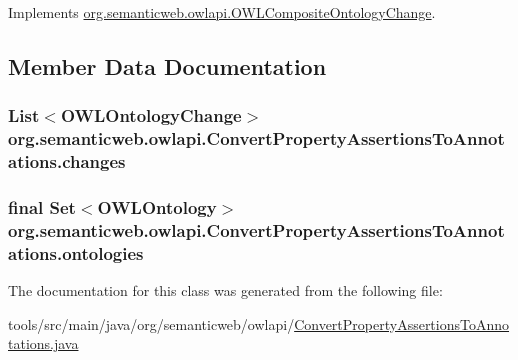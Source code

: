 Implements \hyperlink{interfaceorg_1_1semanticweb_1_1owlapi_1_1_o_w_l_composite_ontology_change_a047d3f540ac840c0ac0285bc576636d2}{org.\-semanticweb.\-owlapi.\-O\-W\-L\-Composite\-Ontology\-Change}.



\subsection{Member Data Documentation}
\hypertarget{classorg_1_1semanticweb_1_1owlapi_1_1_convert_property_assertions_to_annotations_a730c4ead4538d218122f2b6ddeae762f}{
\subsubsection[{changes}]{\setlength{\rightskip}{0pt plus 5cm}List$<${\bf O\-W\-L\-Ontology\-Change}$>$ org.\-semanticweb.\-owlapi.\-Convert\-Property\-Assertions\-To\-Annotations.\-changes\hspace{0.3cm}{\ttfamily [private]}}}\label{classorg_1_1semanticweb_1_1owlapi_1_1_convert_property_assertions_to_annotations_a730c4ead4538d218122f2b6ddeae762f}
\hypertarget{classorg_1_1semanticweb_1_1owlapi_1_1_convert_property_assertions_to_annotations_aefff3119363370dbba8d0019cd449ce6}{
\subsubsection[{ontologies}]{\setlength{\rightskip}{0pt plus 5cm}final Set$<${\bf O\-W\-L\-Ontology}$>$ org.\-semanticweb.\-owlapi.\-Convert\-Property\-Assertions\-To\-Annotations.\-ontologies\hspace{0.3cm}{\ttfamily [private]}}}\label{classorg_1_1semanticweb_1_1owlapi_1_1_convert_property_assertions_to_annotations_aefff3119363370dbba8d0019cd449ce6}


The documentation for this class was generated from the following file\-:\begin{DoxyCompactItemize}
\item 
tools/src/main/java/org/semanticweb/owlapi/\hyperlink{_convert_property_assertions_to_annotations_8java}{Convert\-Property\-Assertions\-To\-Annotations.\-java}\end{DoxyCompactItemize}
